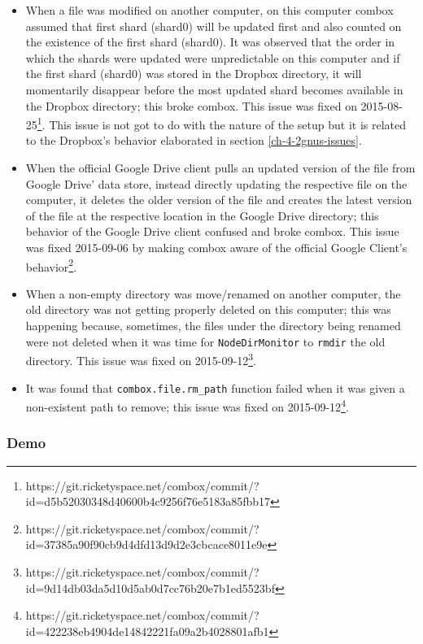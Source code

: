 \begin{itemize}
\item When a file was modified on another computer, on this computer
  combox assumed that first shard (shard0) will be updated first and
  also counted on the existence of the first shard (shard0). It was
  observed that the order in which the shards were updated were
  unpredictable on this computer and if the first shard (shard0) was
  stored in the Dropbox directory, it will momentarily disappear
  before the most updated shard becomes available in the Dropbox
  directory; this broke combox. This issue was fixed on
  2015-08-25\footnote{https://git.ricketyspace.net/combox/commit/?id=d5b52030348d40600b4c9256f76e5183a85fbb17}. This
  issue is not got to do with the nature of the setup but it is
  related to the Dropbox's behavior elaborated in section
  \ref{ch-4-2gnus-issues}.
\item When the official Google Drive client pulls an updated version
  of the file from Google Drive' data store, instead directly updating
  the respective file on the computer, it deletes the older version of
  the file and creates the latest version of the file at the
  respective location in the Google Drive directory; this behavior of
  the Google Drive client confused and broke combox. This issue was
  fixed 2015-09-06 by making combox aware of the official Google
  Client's
  behavior\footnote{https://git.ricketyspace.net/combox/commit/?id=37385a90f90cb9d4dfd13d9d2e3cbcace8011e9e}.
\item When a non-empty directory was move/renamed on another computer,
  the old directory was not getting properly deleted on this computer;
  this was happening because, sometimes, the files under the directory
  being renamed were not deleted when it was time for
  \verb+NodeDirMonitor+ to \verb+rmdir+ the old directory. This issue
  was fixed on
  2015-09-12\footnote{https://git.ricketyspace.net/combox/commit/?id=9d14db03da5d10d5ab0d7cc76b20e7b1ed5523bf}.
\item It was found that \verb+combox.file.rm_path+ function failed
  when it was given a non-existent path to remove; this issue was
  fixed on
  2015-09-12\footnote{https://git.ricketyspace.net/combox/commit/?id=422238eb4904de14842221fa09a2b4028801afb1}.
\end{itemize}

\subsubsection{Demo}

